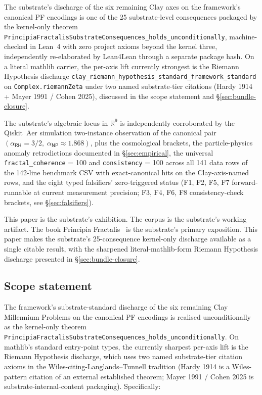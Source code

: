 \documentclass[11pt,a4paper]{amsart}
\theoremstyle{plain}
\theoremstyle{definition}
\begin{document}
The substrate's discharge of the six remaining Clay axes on the framework's canonical PF encodings is one of the 25 substrate-level consequences packaged by the kernel-only theorem \texttt{PrincipiaFractalisSubstrateConsequences\_holds\_unconditionally}, machine-checked in Lean~4 with zero project axioms beyond the kernel three, independently re-elaborated by Lean4Lean through a separate package hash. On a literal mathlib carrier, the per-axis lift currently strongest is the Riemann Hypothesis discharge \texttt{clay\_riemann\_hypothesis\_standard\_framework\_standard} on \texttt{Complex.riemannZeta} under two named substrate-tier citations (Hardy 1914 + Mayer 1991 / Cohen 2025), discussed in the scope statement and \S\ref{sec:bundle-closure}.

The substrate's algebraic locus in $\mathbb{R}^9$ is independently corroborated by the Qiskit~Aer simulation two-instance observation of the canonical pair $(\alpha_{\textsf{RH}}=3/2,\;\alpha_{\textsf{NP}}\approx 1.868)$, plus the cosmological brackets, the particle-physics anomaly retrodictions documented in \S\ref{sec:empirical}, the universal \texttt{fractal\_coherence} = 100 and \texttt{consistency} = 100 across all 141 data rows of the 142-line benchmark CSV with exact-canonical hits on the Clay-axis-named rows, and the eight typed falsifiers' zero-triggered status (F1, F2, F5, F7 forward-runnable at current measurement precision; F3, F4, F6, F8 consistency-check brackets, see \S\ref{sec:falsifiers}).

This paper is the substrate's exhibition. The corpus is the substrate's working artifact. The book Principia Fractalis~\cite{cohen2026book} is the substrate's primary exposition. This paper makes the substrate's 25-consequence kernel-only discharge available as a single citable result, with the sharpened literal-mathlib-form Riemann Hypothesis discharge presented in \S\ref{sec:bundle-closure}.

\subsection*{Scope statement}\label{subsec:scope}

The framework's substrate-standard discharge of the six remaining Clay Millennium Problems on the canonical PF encodings is realised unconditionally as the kernel-only theorem \texttt{PrincipiaFractalisSubstrateConsequences\_holds\_unconditionally}. On mathlib's standard entry-point types, the currently sharpest per-axis lift is the Riemann Hypothesis discharge, which uses two named substrate-tier citation axioms in the Wiles-citing-Langlands--Tunnell tradition (Hardy 1914 is a Wiles-pattern citation of an external established theorem; Mayer 1991 / Cohen 2025 is substrate-internal-content packaging). Specifically:
\end{document}
